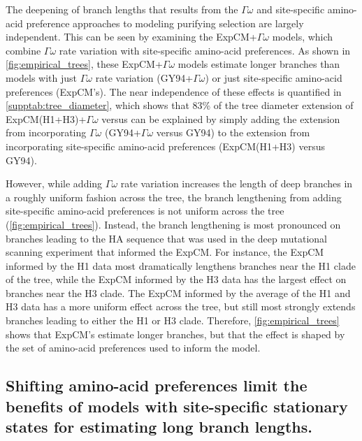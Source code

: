 \documentclass[11pt]{article}
\begin{document}
The deepening of branch lengths that results from the $\Gamma\omega$ and site-specific amino-acid preference approaches to modeling purifying selection are largely independent.
This can be seen by examining the ExpCM+$\Gamma\omega$ models, which combine $\Gamma\omega$ rate variation with site-specific amino-acid preferences.
As shown in \ref{fig:empirical_trees}, these ExpCM+$\Gamma\omega$ models estimate longer branches than models with just $\Gamma\omega$ rate variation (GY94+$\Gamma\omega$) or just site-specific amino-acid preferences (ExpCM's).
The near independence of these effects is quantified in \ref{supptab:tree_diameter}, which shows that 83\% of the tree diameter extension of ExpCM(H1+H3)+$\Gamma\omega$ versus can be explained by simply adding the extension from incorporating $\Gamma\omega$ (GY94+$\Gamma\omega$ versus GY94) to the extension from incorporating site-specific amino-acid preferences (ExpCM(H1+H3) versus GY94).

However, while adding $\Gamma\omega$ rate variation increases the length of deep branches in a roughly uniform fashion across the tree, the branch lengthening from adding site-specific amino-acid preferences is not uniform across the tree (\ref{fig:empirical_trees}). 
Instead, the branch lengthening is most pronounced on branches leading to the HA sequence that was used in the deep mutational scanning experiment that informed the ExpCM.
For instance, the ExpCM informed by the H1 data most dramatically lengthens branches near the H1 clade of the tree, while the ExpCM informed by the H3 data has the largest effect on branches near the H3 clade.
The ExpCM informed by the average of the H1 and H3 data has a more uniform effect across the tree, but still most strongly extends branches leading to either the H1 or H3 clade.
Therefore, \ref{fig:empirical_trees} shows that ExpCM's estimate longer branches, but that the effect is shaped by the set of amino-acid preferences used to inform the model.

\subsection*{Shifting amino-acid preferences limit the benefits of models with site-specific stationary states for estimating long branch lengths.}
\end{document}
